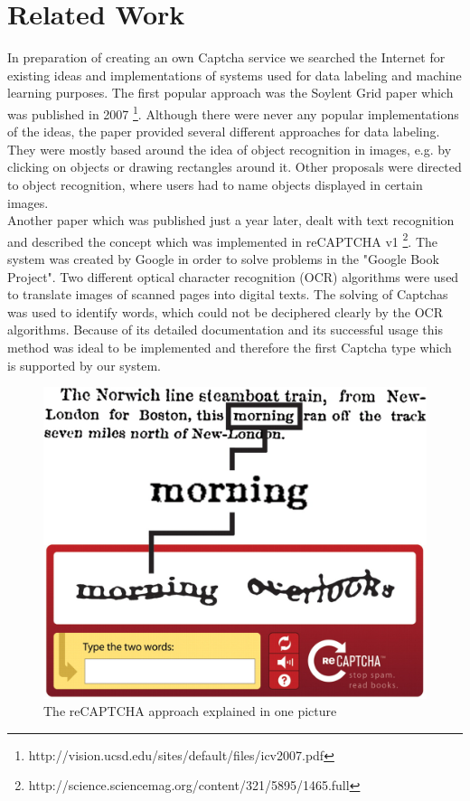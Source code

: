 \section{Related Work}
\label{sec:related_work}

In preparation of creating an own Captcha service we searched the Internet for existing ideas and implementations of systems used for data labeling and machine learning purposes. The first popular approach was the Soylent Grid paper which was published in 2007 \footnote{http://vision.ucsd.edu/sites/default/files/icv2007.pdf}. Although there were never any popular implementations of the ideas, the paper provided several different approaches for data labeling. They were mostly based around the idea of object recognition in images, e.g. by clicking on objects or drawing rectangles around it. Other proposals were directed to object recognition, where users had to name objects displayed in certain images.\\
Another paper which was published just a year later, dealt with text recognition and described the concept which was implemented in reCAPTCHA v1 \footnote{http://science.sciencemag.org/content/321/5895/1465.full}. The system was created by Google in order to solve problems in the "Google Book Project". Two different optical character recognition (OCR) algorithms were used to translate images of scanned pages into digital texts. The solving of Captchas was used to identify words, which could not be deciphered clearly by the OCR algorithms. Because of its detailed documentation and its successful usage this method was ideal to be implemented and therefore the first Captcha type which is supported by our system. \\
\begin{figure}[!h]
	\centering
	\includegraphics[width=0.4\linewidth]{content/figures/recaptcha.jpg}
	\caption{The reCAPTCHA approach explained in one picture}
	\label{fig:recaptcha}
\end{figure}

\clearpage
